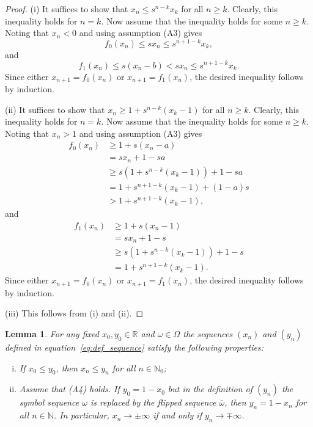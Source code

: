 \documentclass[a4paper,12pt]{article}
\newtheorem{lemma}{Lemma}[section]
\begin{document}
\begin{proof}
(i) It suffices to show that $x_n \leq s^{n-k} x_k$ for all $n \geq k$. Clearly, this inequality holds for $n=k$. Now assume that the inequality holds for some $n \geq k$. Noting that $x_n < 0$ and using assumption (A3) gives
\[
f_0(x_n)
	\leq sx_n 
	\leq s^{n+1-k} x_k,
\]
and
\[
f_1(x_n)
	\leq s(x_n-b)
	< sx_n
	\leq s^{n+1-k}x_k.
\]
Since either $x_{n+1} = f_0(x_n)$ or $x_{n+1} = f_1(x_n)$, the desired inequality follows by induction.

(ii) It suffices to show that $x_n \geq 1 + s^{n-k}(x_k-1)$ for all $n \geq k$. Clearly, this inequality holds for $n=k$. Now assume that the inequality holds for some $n \geq k$. Noting that $x_n > 1$ and using assumption (A3) gives
\[
\begin{split}
f_0(x_n)
	& \geq 1 + s(x_n-a) \\
	& = sx_n + 1-sa \\
	& \geq s(1 + s^{n-k}(x_k-1)) + 1-sa \\
	& = 1 + s^{n+1-k}(x_k-1) + (1-a)s \\
	& > 1 + s^{n+1-k}(x_k-1),
\end{split}
\]
and
\[
\begin{split}
f_1(x_n)
	& \geq 1 + s(x_n-1) \\
	& = sx_n + 1-s \\
	& \geq s(1 + s^{n-k}(x_k-1)) + 1-s \\
	& = 1+s^{n+1-k}(x_k-1).
\end{split}
\]
Since either $x_{n+1} = f_0(x_n)$ or $x_{n+1} = f_1(x_n)$, the desired inequality follows by induction.

(iii) This follows from (i) and (ii).
\end{proof}


\begin{lemma}
\label{lemma:properties2}
For any fixed $x_0, y_0 \in \mathbb{R}$ and $\omega \in \Omega$ the sequences $(x_n)$ and $(y_n)$ defined in equation~\eqref{eq:def_sequence} satisfy the following properties:
\begin{enumerate}[(i)]
\item If $x_0 \leq y_0$, then $x_n \leq y_n$ for all $n \in \mathbb{N}_0$;
\item Assume that (A4) holds. If $y_0 = 1-x_0$ but in the definition of $(y_n)$ the symbol sequence $\omega$ is replaced by the flipped sequence $\overline{\omega}$, then $y_n = 1-x_n$ for all $n \in \mathbb{N}$. In particular, $x_n \to \pm\infty$ if and only if $y_n \to \mp \infty$.
\end{enumerate}
\end{lemma}
\end{document}
